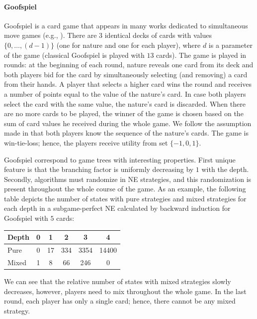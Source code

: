 \paragraph{\textbf{Goofspiel}}
Goofspiel is a card game that appears in many works dedicated to simultaneous move games (e.g., \cite{Ross71Goofspiel,Rhoads12Computer,Saffidine12SMAB,Lanctot13Goofspiel}). 
There are $3$ identical decks of cards with values $\{0,\dots, (d-1)\}$ (one for nature and one for each player), where $d$ is a parameter of the game (classical Goofspiel is played with $13$ cards). 
The game is played in rounds: at the beginning of each round, nature reveals one card from its deck and both players bid for the card by simultaneously selecting (and removing) a card from their hands. 
A player that selects a higher card wins the round and receives a number of points equal to the value of the nature's card. In case both players select the card with the same value, the nature's card is discarded. 
When there are no more cards to be played, the winner of the game is chosen based on the sum of card values he received during the whole game. 
We follow the assumption made in \cite{Saffidine12SMAB} that both players know the sequence of the nature's cards. 
The game is win-tie-loss; hence, the players receive utility from set $\lbrace -1, 0, 1 \rbrace$.

Goofspiel correspond to game trees with interesting properties. 
First unique feature is that the branching factor is uniformly decreasing by $1$ with the depth.
Secondly, algorithms must randomize in NE strategies, and this randomization is present throughout the whole course of the game.
As an example, the following table depicts the number of states with pure strategies and mixed strategies for each depth in a subgame-perfect NE calculated by backward induction for Goofspiel with $5$ cards:

\begin{table}[h!]
\centering
\small
\begin{tabular}{|l|c|c|c|c|c|}
\hline Depth & 0 & 1 & 2 & 3 & 4 \\
\hline Pure  & 0 & 17 & 334 & 3354 & 14400 \\
\hline Mixed & 1 &  8 &  66 &  246 & 0 \\
\hline
\end{tabular}
\end{table}
\vspace{1.5cm}
We can see that the relative number of states with mixed strategies slowly decreases, however, players need to mix throughout the whole game.
In the last round, each player has only a single card; hence, there cannot be any mixed strategy.

